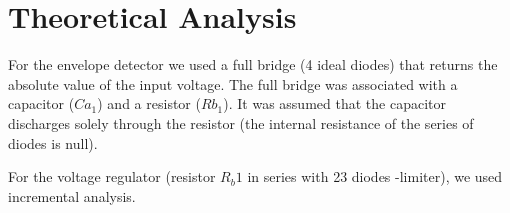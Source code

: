 \section{Theoretical Analysis} \label{sec:analysis}

For the envelope detector we used a full bridge (4 ideal diodes) that returns the absolute value of the input voltage. The full bridge was associated with a capacitor ($Ca_1$) and a resistor ($Rb_1$). It was assumed that the capacitor discharges solely through the resistor (the internal resistance of the series of diodes is null).

For the voltage regulator (resistor $R_b1$ in series with 23 diodes -limiter), we used incremental analysis.




